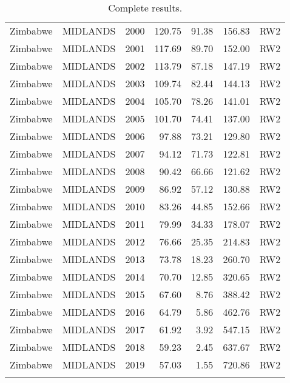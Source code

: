 \begin{longtable}{lllrrrl}
  Zimbabwe & MIDLANDS & 2000 & 120.75 & 91.38 & 156.83 & RW2 \\ 
  Zimbabwe & MIDLANDS & 2001 & 117.69 & 89.70 & 152.00 & RW2 \\ 
  Zimbabwe & MIDLANDS & 2002 & 113.79 & 87.18 & 147.19 & RW2 \\ 
  Zimbabwe & MIDLANDS & 2003 & 109.74 & 82.44 & 144.13 & RW2 \\ 
  Zimbabwe & MIDLANDS & 2004 & 105.70 & 78.26 & 141.01 & RW2 \\ 
  Zimbabwe & MIDLANDS & 2005 & 101.70 & 74.41 & 137.00 & RW2 \\ 
  Zimbabwe & MIDLANDS & 2006 & 97.88 & 73.21 & 129.80 & RW2 \\ 
  Zimbabwe & MIDLANDS & 2007 & 94.12 & 71.73 & 122.81 & RW2 \\ 
  Zimbabwe & MIDLANDS & 2008 & 90.42 & 66.66 & 121.62 & RW2 \\ 
  Zimbabwe & MIDLANDS & 2009 & 86.92 & 57.12 & 130.88 & RW2 \\ 
  Zimbabwe & MIDLANDS & 2010 & 83.26 & 44.85 & 152.66 & RW2 \\ 
  Zimbabwe & MIDLANDS & 2011 & 79.99 & 34.33 & 178.07 & RW2 \\ 
  Zimbabwe & MIDLANDS & 2012 & 76.66 & 25.35 & 214.83 & RW2 \\ 
  Zimbabwe & MIDLANDS & 2013 & 73.78 & 18.23 & 260.70 & RW2 \\ 
  Zimbabwe & MIDLANDS & 2014 & 70.70 & 12.85 & 320.65 & RW2 \\ 
  Zimbabwe & MIDLANDS & 2015 & 67.60 & 8.76 & 388.42 & RW2 \\ 
  Zimbabwe & MIDLANDS & 2016 & 64.79 & 5.86 & 462.76 & RW2 \\ 
  Zimbabwe & MIDLANDS & 2017 & 61.92 & 3.92 & 547.15 & RW2 \\ 
  Zimbabwe & MIDLANDS & 2018 & 59.23 & 2.45 & 637.67 & RW2 \\ 
  Zimbabwe & MIDLANDS & 2019 & 57.03 & 1.55 & 720.86 & RW2 \\ 
  \hline
\caption{Complete results.} 
\label{fulltable}
\end{longtable}

